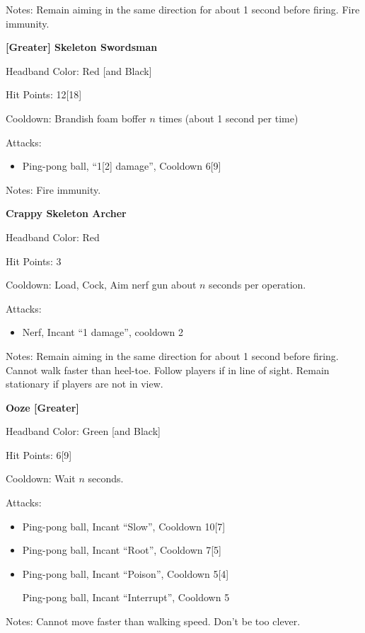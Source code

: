\documentclass[green]{grimrock}
\begin{document}
Notes: Remain aiming in the same direction for about 1 second before firing. Fire immunity.

\medskip

{\bf [Greater] Skeleton Swordsman}

Headband Color: Red [and Black]

Hit Points: 12[18]

Cooldown: Brandish foam boffer $n$ times (about 1 second per time)

Attacks:
\begin{itemize}
\item Ping-pong ball, ``1[2] damage'', Cooldown 6[9]
\end{itemize}

Notes: Fire immunity.

\medskip

{\bf Crappy Skeleton Archer}

Headband Color: Red

Hit Points: 3

Cooldown: Load, Cock, Aim nerf gun about $n$ seconds per operation.

Attacks:
\begin{itemize}
\item Nerf, Incant ``1 damage'', cooldown 2
\end{itemize}

Notes: Remain aiming in the same direction for about 1 second before firing. Cannot walk faster than heel-toe. Follow players if in line of sight. Remain stationary if players are not in view.

\medskip

{\bf Ooze [Greater] }

Headband Color: Green [and Black]

Hit Points: 6[9]

Cooldown: Wait $n$ seconds.

Attacks:
\begin{itemize}
\item Ping-pong ball, Incant ``Slow'', Cooldown 10[7]
\item Ping-pong ball, Incant ``Root'', Cooldown 7[5]
\item Ping-pong ball, Incant ``Poison'', Cooldown 5[4]
\item [Ping-pong ball, Incant ``Interrupt'', Cooldown 5]
\end{itemize}

Notes: Cannot move faster than walking speed. Don't be too clever.
\end{document}
